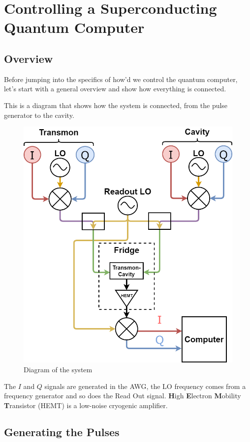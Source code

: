 \chapter{Controlling a Superconducting Quantum Computer} \label{chap:FPGA}
\section{Overview}
Before jumping into the specifics of how'd we control the quantum computer, let's start with a general overview and show how everything is connected.

This is a diagram that shows how the system is connected, from the pulse generator to the cavity.

\begin{figure}[H]
    \centering
    \includegraphics[width=0.85\columnwidth]{gfx/overview.png}
    \caption{Diagram of the system}
    \label{fig:System-diagram}
\end{figure}

The $I$ and $Q$ signals are generated in the AWG, the LO frequency comes from a frequency generator and so does the Read Out signal. \textbf{H}igh \textbf{E}lectron \textbf{M}obility \textbf{T}ransistor (HEMT) is a low-noise cryogenic amplifier.

\section{Generating the Pulses}
